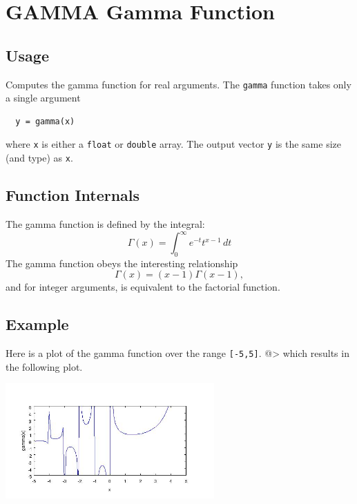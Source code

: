 \section{GAMMA Gamma Function}

\subsection{Usage}

Computes the gamma function for real arguments.  The \verb|gamma|
function takes only a single argument
\begin{verbatim}
  y = gamma(x)
\end{verbatim}
where \verb|x| is either a \verb|float| or \verb|double| array.  The output
vector \verb|y| is the same size (and type) as \verb|x|.
\subsection{Function Internals}

The gamma function is defined by the integral:
\[
  \Gamma(x) = \int_{0}^{\infty} e^{-t} t^{x-1} \, dt
\]
The gamma function obeys the interesting relationship
\[
  \Gamma(x) = (x-1)\Gamma(x-1),
\]
and for integer arguments, is equivalent to the factorial function.
\subsection{Example}

Here is a plot of the gamma function over the range \verb|[-5,5]|.
@>
which results in the following plot.


\centerline{\includegraphics[width=8cm]{gamma1}}

